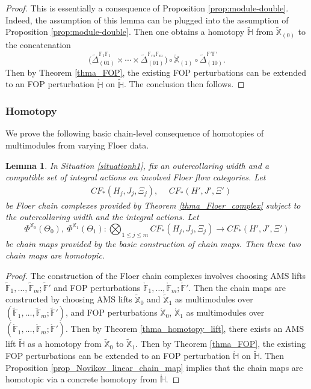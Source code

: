 \documentclass[reqno, 10pt]{amsart}
\numberwithin{equation}{section}
\numberwithin{equation}{section}
\newtheorem{lemma}[thm]{Lemma}
\theoremstyle{definition}
\theoremstyle{remark}
\newcommand{\beqn}{\begin{equation*}}
\newcommand{\eeqn}{\end{equation*}}
\newcommand{\mb}{\mathbb}
\begin{document}
\begin{proof}
This is essentially a consequence of Proposition \ref{prop:module-double}. Indeed, the assumption of this lemma can be plugged into the assumption of Proposition \ref{prop:module-double}. Then one obtains a homotopy $\tilde {\mb H}$ from $\tilde {\mb X}_{(0)}$ to the concatenation
\beqn
\Big( \tilde{\mb{\Delta}}_{(01)}^{\mb{F}_1 \mb{F}_1} \times \cdots \times \tilde{\mb{\Delta}}_{(01)}^{\mb{F}_m \mb{F}_m} \Big) \circ \tilde {\mb X}_{(1)} \circ \tilde{\mb{\Delta}}_{(10)}^{\mb{F}'\mb{F}'}.
\eeqn
Then by Theorem \ref{thma_FOP}, the existing FOP perturbations can be extended to an FOP perturbation $\mathring {\mb H}$ on $\tilde {\mb H}$. The conclusion then follows. 
\end{proof}

\subsubsection{Homotopy}

We prove the following basic chain-level consequence of homotopies of multimodules from varying Floer data.

\begin{lemma}\label{lemma134}
In Situation \ref{situationh1}, fix an outercollaring width and a compatible set of integral actions on involved Floer flow categories. Let 
\begin{align*}
&\ CF_*(H_j, J_j, \Xi_j),\ &\ CF_*(H', J', \Xi')
\end{align*}
be Floer chain complexes provided by Theorem \ref{thma_Floer_complex} subject to the outercollaring width and the integral actions. Let 
\beqn
\Phi^{{\mb X}_0}(\Theta_0),\ \Phi^{{\mb X}_1}(\Theta_1): \bigotimes_{1\leq j \leq m} CF_*(H_j, J_j, \Xi_j) \to CF_*(H', J', \Xi')
\eeqn
be chain maps provided by the basic construction of chain maps. Then these two chain maps are homotopic.
\end{lemma}

\begin{proof}
The construction of the Floer chain complexes involves choosing AMS lifts $\tilde {\mb F}_1, \ldots, \tilde {\mb F}_m; \tilde {\mb F}'$ and FOP perturbations $\mathring {\mb F}_1, \ldots, \mathring {\mb F}_m; \mathring {\mb F}'$. Then the chain maps are constructed by choosing AMS lifts $\tilde {\mb X}_0$ and $\tilde {\mb X}_1$ 
as multimodules over $(\tilde {\mb F}_1, \ldots, \tilde {\mb F}_m; \tilde {\mb F}')$, and FOP perturbations $\mathring {\mb X}_0$, $\mathring {\mb X}_1$ as multimodules over $(\mathring {\mb F}_1, \ldots, \mathring {\mb F}_m; \mathring {\mb F}')$. Then by Theorem \ref{thma_homotopy_lift}, there exists an AMS lift $\tilde {\mb H}$ as a homotopy from $\tilde {\mb X}_0$ to $\tilde {\mb X}_1$. Then by Theorem \ref{thma_FOP}, the existing FOP perturbations can be extended to an FOP perturbation $\mathring {\mb H}$ on $\tilde {\mb H}$. Then Proposition \ref{prop_Novikov_linear_chain_map} implies that the chain maps are homotopic via a concrete homotopy from $\mathring {\mb H}$.
\end{proof}
\end{document}
